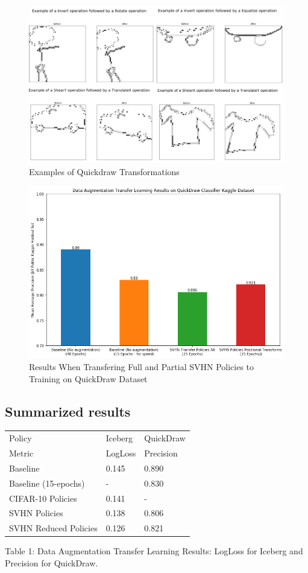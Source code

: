 \documentclass[10pt,twocolumn,letterpaper]{article}
\begin{document}
\begin{figure}[bhp]
\includegraphics[width=\columnwidth]{quickdraw_compiled_transform_exmples.png}
\caption{Examples of Quickdraw Transformations}
\end{figure}

\begin{figure}[bhp]
\includegraphics[width=\columnwidth]{quickdraw_results.png}
\caption{Results When Transfering Full and Partial SVHN Policies to Training on QuickDraw Dataset}
\end{figure}

\subsection{Summarized results}
		\begin{table}[h]
			\begin{tabular}{lll}
				\hline
				Policy &Iceberg &QuickDraw   \\ 
				Metric &LogLoss &Precision   \\ \hline
				Baseline  &0.145 &0.890\\
				Baseline (15-epochs) &-  &0.830\\
				CIFAR-10 Policies &0.141  &-\\ 
				SVHN Policies	&0.138  &0.806\\
				SVHN Reduced Policies	&0.126  &0.821\\	
				\hline
			\end{tabular}
		\end{table}
Table 1: Data Augmentation Transfer Learning Results: LogLoss for Iceberg and Precision for QuickDraw.
\end{document}
